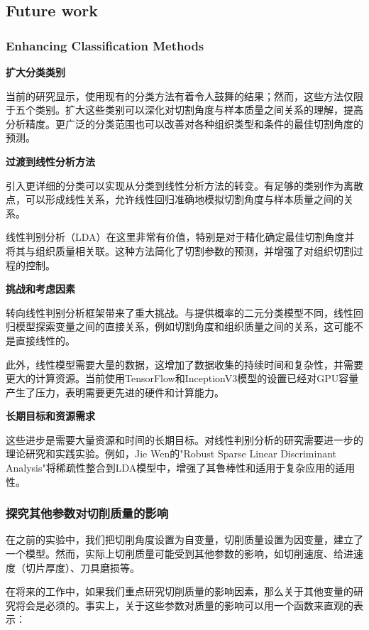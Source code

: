 \subsection{Future work}
\subsubsection{Enhancing Classification Methods}

\textbf{扩大分类类别}

当前的研究显示，使用现有的分类方法有着令人鼓舞的结果；然而，这些方法仅限于五个类别。扩大这些类别可以深化对切割角度与样本质量之间关系的理解，提高分析精度。更广泛的分类范围也可以改善对各种组织类型和条件的最佳切割角度的预测。

\textbf{过渡到线性分析方法}

引入更详细的分类可以实现从分类到线性分析方法的转变。有足够的类别作为离散点，可以形成线性关系，允许线性回归准确地模拟切割角度与样本质量之间的关系。

线性判别分析（LDA）在这里非常有价值，特别是对于精化确定最佳切割角度并将其与组织质量相关联。这种方法简化了切割参数的预测，并增强了对组织切割过程的控制。

\textbf{挑战和考虑因素}

转向线性判别分析框架带来了重大挑战。与提供概率的二元分类模型不同，线性回归模型探索变量之间的直接关系，例如切割角度和组织质量之间的关系，这可能不是直接线性的。

此外，线性模型需要大量的数据，这增加了数据收集的持续时间和复杂性，并需要更大的计算资源。当前使用TensorFlow和InceptionV3模型的设置已经对GPU容量产生了压力，表明需要更先进的硬件和计算能力。

\textbf{长期目标和资源需求}

这些进步是需要大量资源和时间的长期目标。对线性判别分析的研究需要进一步的理论研究和实践实验。例如，Jie Wen的"Robust Sparse Linear Discriminant Analysis"将稀疏性整合到LDA模型中，增强了其鲁棒性和适用于复杂应用的适用性\cite{6.1}。

\subsubsection{探究其他参数对切削质量的影响}

在之前的实验中，我们把切削角度设置为自变量，切削质量设置为因变量，建立了一个模型。然而，实际上切削质量可能受到其他参数的影响，如切削速度、给进速度（切片厚度）、刀具磨损等。

在将来的工作中，如果我们重点研究切削质量的影响因素，那么关于其他变量的研究将会是必须的。事实上，关于这些参数对质量的影响可以用一个函数来直观的表示：

